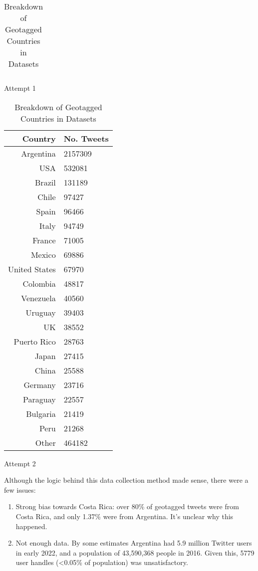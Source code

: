 \begin{table}[H]
\begin{subtable}[h]{0.5\textwidth}
\begin{tabular}{r|l}
        \end{tabular}
       \caption{Attempt 1}
       \label{tab:attempt1}
    \end{subtable}
    \hfill
    \begin{subtable}[h]{0.5\textwidth}
        \centering
        \begin{tabular}{r|l}
            \textbf{Country} & \textbf{No. Tweets} \\
            \hline
            Argentina & 2157309 \\
            USA & 532081 \\
            Brazil & 131189 \\
            Chile & 97427 \\
            Spain & 96466 \\
            Italy & 94749 \\
            France & 71005 \\
            Mexico & 69886 \\
            United States & 67970 \\
            Colombia & 48817 \\
            Venezuela & 40560 \\
            Uruguay & 39403 \\
            UK & 38552 \\
            Puerto Rico & 28763 \\
            Japan & 27415 \\
            China & 25588 \\
            Germany & 23716 \\
            Paraguay & 22557 \\
            Bulgaria & 21419 \\
            Peru & 21268 \\
            Other & 464182 \\
        \end{tabular}
        
        \caption{Attempt 2}
        \label{tab:attempt2}
     \end{subtable}
     \caption{Breakdown of Geotagged Countries in Datasets}
     \label{tab:attempts}
\end{table}

Although the logic behind this data collection method made sense, there were a few issues: 

\begin{enumerate}
    \item Strong bias towards Costa Rica: over 80\% of geotagged tweets were from Costa Rica, and only 1.37\% were from Argentina. It’s unclear why this happened.
    \item Not enough data. By some estimates \cite{noauthor_digital_nodate} Argentina had 5.9 million Twitter users in early 2022, and a population of 43,590,368 people in 2016. Given this, 5779 user handles (<0.05\% of population) was unsatisfactory.
\end{enumerate}

